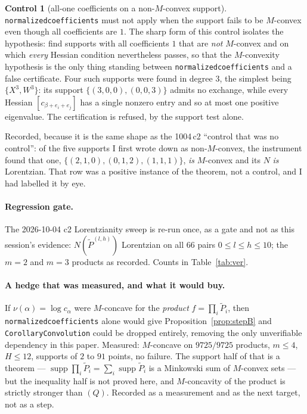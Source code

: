 \documentclass[11pt]{article}
\theoremstyle{plain}
\theoremstyle{definition}
\newtheorem{control}[theorem]{Control}
\DeclareMathOperator{\supp}{supp}
\newcommand{\Pt}{\widetilde P}
\begin{document}
\begin{control}[all-one coefficients on a non-$M$-convex support]
\verb|normalizedcoefficients| must not apply when the support fails to be $M$-convex even
though all coefficients are $1$. The sharp form of this control isolates the hypothesis:
find supports with all coefficients $1$ that are \emph{not} $M$-convex and on which
\emph{every} Hessian condition nevertheless passes, so that the $M$-convexity hypothesis is
the only thing standing between \verb|normalizedcoefficients| and a false certificate.
Four such supports were found in degree $3$, the simplest being $\{X^3,W^3\}$: its support
$\{(3,0,0),(0,0,3)\}$ admits no exchange, while every Hessian $[c_{\beta+e_i+e_j}]$ has a
single nonzero entry and so at most one positive eigenvalue. The certification is refused,
by the support test alone.

Recorded, because it is the same shape as the 1004\,c2 ``control that was no control'': of
the five supports I first wrote down as non-$M$-convex, the instrument found that one,
$\{(2,1,0),(0,1,2),(1,1,1)\}$, \emph{is} $M$-convex and its $N$ \emph{is} Lorentzian. That
row was a positive instance of the theorem, not a control, and I had labelled it by eye.
\end{control}

\paragraph{Regression gate.}
The 2026-10-04 c2 Lorentzianity sweep is re-run once, as a gate and not as this session's
evidence: $N(\Pt^{(l,h)})$ Lorentzian on all $66$ pairs $0\le l\le h\le10$; the $m=2$ and
$m=3$ products as recorded. Counts in Table~\ref{tab:ver}.

\paragraph{A hedge that was measured, and what it would buy.}
If $\nu(\alpha)=\log c_\alpha$ were $M$-concave for the \emph{product} $f=\prod_i\Pt_i$,
then \verb|normalizedcoefficients| alone would give Proposition~\ref{prop:stepB} and
\verb|CorollaryConvolution| could be dropped entirely, removing the only unverifiable
dependency in this paper. Measured: $M$-concave on $9725/9725$ products, $m\le4$,
$H\le12$, supports of $2$ to $91$ points, no failure. The support half of that is a
theorem --- $\supp\prod_i\Pt_i=\sum_i\supp\Pt_i$ is a Minkowski sum of $M$-convex sets ---
but the inequality half is not proved here, and $M$-concavity of the product is strictly
stronger than $(Q)$. Recorded as a measurement and as the next target, not as a step.
\end{document}
